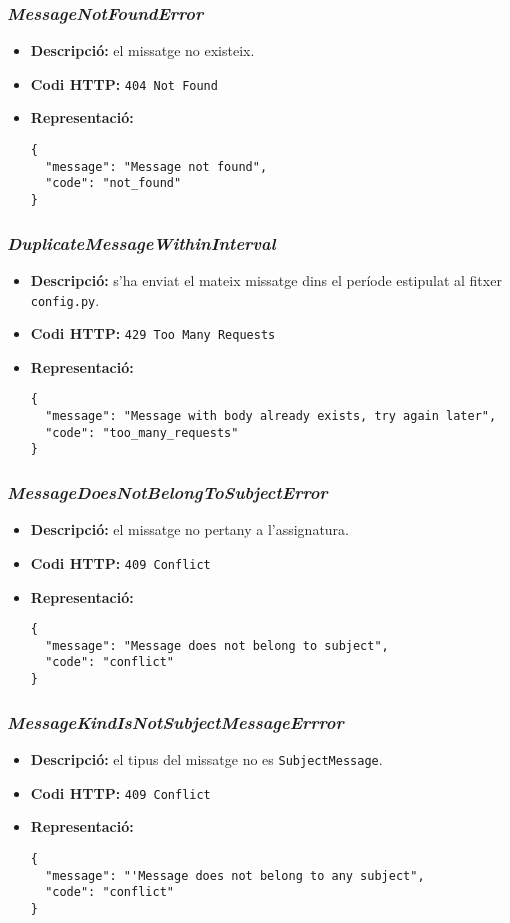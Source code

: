 \subsubsection{\emph{MessageNotFoundError}}
\begin{itemize}
	\item \textbf{Descripció:} el missatge no existeix.
	\item \textbf{Codi \ac{HTTP}:} \texttt{404 Not Found}
	\item \textbf{Representació:}
\begin{verbatim}
{
  "message": "Message not found",
  "code": "not_found"
}
\end{verbatim}
\end{itemize}


\subsubsection{\emph{DuplicateMessageWithinInterval}}
\begin{itemize}
	\item \textbf{Descripció:} s'ha enviat el mateix missatge dins el període estipulat al fitxer \texttt{config.py}.
	\item \textbf{Codi \ac{HTTP}:} \texttt{429 Too Many Requests}
	\item \textbf{Representació:}
\begin{verbatim}
{
  "message": "Message with body already exists, try again later",
  "code": "too_many_requests"
}
\end{verbatim}
\end{itemize}

\subsubsection{\emph{MessageDoesNotBelongToSubjectError}}
\begin{itemize}
	\item \textbf{Descripció:} el missatge no pertany a l'assignatura.
	\item \textbf{Codi \ac{HTTP}:} \texttt{409 Conflict}
	\item \textbf{Representació:}
\begin{verbatim}
{
  "message": "Message does not belong to subject",
  "code": "conflict"
}
\end{verbatim}
\end{itemize}
\subsubsection{\emph{MessageKindIsNotSubjectMessageErrror}}
\begin{itemize}
	\item \textbf{Descripció:} el tipus del missatge no es \texttt{SubjectMessage}.
	\item \textbf{Codi \ac{HTTP}:} \texttt{409 Conflict}
	\item \textbf{Representació:}
\begin{verbatim}
{
  "message": "'Message does not belong to any subject",
  "code": "conflict"
}
\end{verbatim}
\end{itemize}

